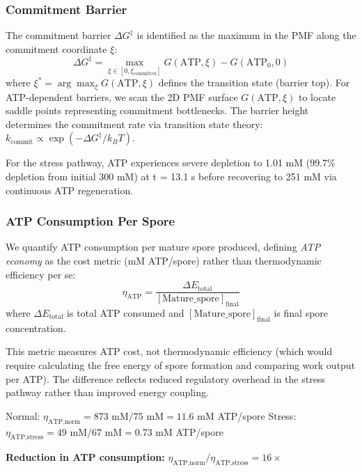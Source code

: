 \documentclass[twocolumn,11pt]{article}
\begin{document}
\subsubsection{Commitment Barrier}

The commitment barrier $\Delta G^\ddagger$ is identified as the maximum in the PMF along the commitment coordinate $\xi$:
\begin{equation}
    \Delta G^\ddagger = \max_{\xi \in [0, \xi_{\text{committed}}]} G(\text{ATP}, \xi) - G(\text{ATP}_0, 0)
\end{equation}
where $\xi^* = \arg\max_\xi G(\text{ATP}, \xi)$ defines the transition state (barrier top). For ATP-dependent barriers, we scan the 2D PMF surface $G(\text{ATP}, \xi)$ to locate saddle points representing commitment bottlenecks. The barrier height determines the commitment rate via transition state theory: $k_{\text{commit}} \propto \exp(-\Delta G^\ddagger / k_B T)$.

For the stress pathway, ATP experiences severe depletion to 1.01 mM (99.7\% depletion from initial 300 mM) at t = 13.1 s before recovering to 251 mM via continuous ATP regeneration.

\subsubsection{ATP Consumption Per Spore}

We quantify ATP consumption per mature spore produced, defining \textit{ATP economy} as the cost metric (mM ATP/spore) rather than thermodynamic efficiency per se:
\begin{equation}
    \eta_{\text{ATP}} = \frac{\Delta E_{\text{total}}}{[\text{Mature\_spore}]_{\text{final}}}
\end{equation}
where $\Delta E_{\text{total}}$ is total ATP consumed and $[\text{Mature\_spore}]_{\text{final}}$ is final spore concentration.

This metric measures ATP cost, not thermodynamic efficiency (which would require calculating the free energy of spore formation and comparing work output per ATP). The difference reflects reduced regulatory overhead in the stress pathway rather than improved energy coupling.


Normal: $\eta_{\text{ATP,norm}} = 873 \text{ mM} / 75 \text{ mM} = 11.6$ mM ATP/spore
Stress: $\eta_{\text{ATP,stress}} = 49 \text{ mM} / 67 \text{ mM} = 0.73$ mM ATP/spore


\textbf{Reduction in ATP consumption:} $\eta_{\text{ATP,norm}} / \eta_{\text{ATP,stress}} = 16\times$
\end{document}
